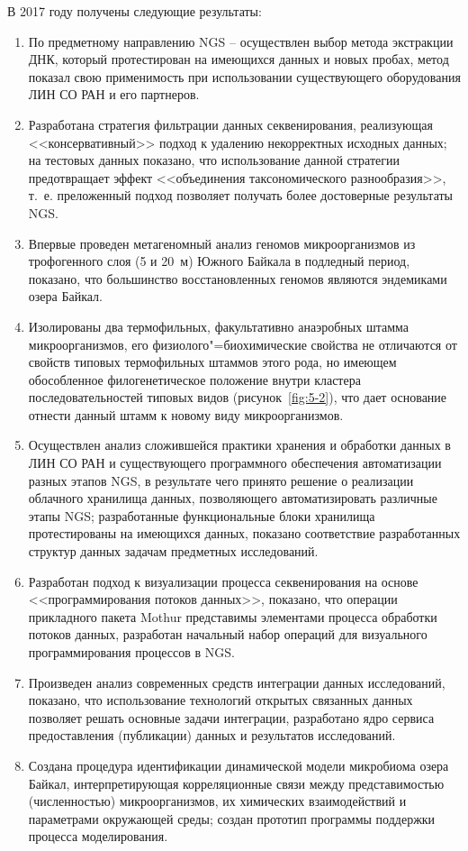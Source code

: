 \documentclass[a4paper,12pt,openany,final]{extreport}
\newcommand\theyear{2017}
\begin{document}
В \theyear{} году получены следующие результаты:
\begin{enumerate}
\item По предметному направлению NGS -- осуществлен выбор метода экстракции ДНК, который протестирован на имеющихся данных и новых пробах, метод показал свою применимость при использовании существующего оборудования ЛИН СО РАН и его партнеров.
\item Разработана стратегия фильтрации данных секвенирования, реализующая <<консервативный>> подход к удалению некорректных исходных данных; на тестовых данных показано, что использование данной стратегии предотвращает эффект <<объединения таксономического разнообразия>>, т.~е. преложенный подход позволяет получать более достоверные результаты NGS.
\item Впервые проведен метагеномный анализ геномов микроорганизмов из трофогенного слоя (5 и 20~м) Южного Байкала в подледный период, показано, что большинство восстановленных геномов являются эндемиками озера Байкал.
\item Изолированы два термофильных, факультативно анаэробных штамма микроорганизмов, его физиолого"=биохимические свойства не отличаются от свойств типовых термофильных штаммов этого рода, но имеющем обособленное филогенетическое положение внутри кластера последовательностей типовых видов (рисунок~\ref{fig:5-2}), что дает основание отнести данный штамм к новому виду микроорганизмов.
\item Осуществлен анализ сложившейся практики хранения и обработки данных в ЛИН СО РАН и существующего программного обеспечения автоматизации разных этапов NGS, в результате чего принято решение о реализации облачного хранилища данных, позволяющего автоматизировать различные этапы NGS; разработанные функциональные блоки хранилища протестированы на имеющихся данных, показано соответствие разработанных структур данных задачам предметных исследований.
\item Разработан подход к визуализации процесса секвенирования на основе <<программирования потоков данных>>, показано, что операции прикладного пакета Mothur представимы элементами процесса обработки потоков данных, разработан начальный набор операций для визуального программирования процессов в NGS.
\item Произведен анализ современных средств интеграции данных исследований, показано, что использование технологий открытых связанных данных позволяет решать  основные задачи интеграции, разработано ядро сервиса предоставления (публикации) данных и результатов исследований.
\item Создана процедура идентификации динамической модели микробиома озера Байкал, интерпретирующая корреляционные связи между представимостью (численностью) микроорганизмов, их химических взаимодействий и параметрами окружающей среды; создан прототип программы поддержки процесса моделирования.
\end{enumerate}
\end{document}
